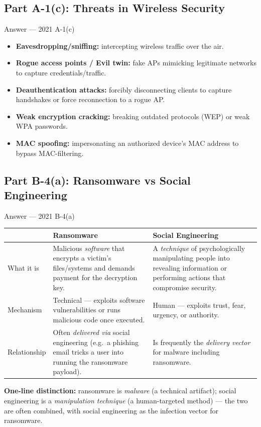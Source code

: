 \documentclass[12pt,a4paper]{article}
\begin{document}
\subsection{Part A-1(c): Threats in Wireless Security}
\begin{solbox}{Answer --- 2021 A-1(c)}
\begin{itemize}[noitemsep]
  \item \textbf{Eavesdropping/sniffing:} intercepting wireless traffic over the air.
  \item \textbf{Rogue access points / Evil twin:} fake APs mimicking legitimate networks to capture credentials/traffic.
  \item \textbf{Deauthentication attacks:} forcibly disconnecting clients to capture handshakes or force reconnection to a rogue AP.
  \item \textbf{Weak encryption cracking:} breaking outdated protocols (WEP) or weak WPA passwords.
  \item \textbf{MAC spoofing:} impersonating an authorized device's MAC address to bypass MAC-filtering.
\end{itemize}
\end{solbox}

\subsection{Part B-4(a): Ransomware vs Social Engineering}
\begin{solbox}{Answer --- 2021 B-4(a)}
\begin{center}
\renewcommand{\arraystretch}{1.3}
\begin{tabular}{l|p{5.3cm}|p{5.3cm}}
\toprule
 & \textbf{Ransomware} & \textbf{Social Engineering} \\
\midrule
What it is & Malicious \emph{software} that encrypts a victim's files/systems and demands payment for the decryption key. & A \emph{technique} of psychologically manipulating people into revealing information or performing actions that compromise security. \\
Mechanism & Technical --- exploits software vulnerabilities or runs malicious code once executed. & Human --- exploits trust, fear, urgency, or authority. \\
Relationship & Often \emph{delivered via} social engineering (e.g.\ a phishing email tricks a user into running the ransomware payload). & Is frequently the \emph{delivery vector} for malware including ransomware. \\
\bottomrule
\end{tabular}
\end{center}
\textbf{One-line distinction:} ransomware is \emph{malware} (a technical artifact); social engineering is a \emph{manipulation technique} (a human-targeted method) --- the two are often combined, with social engineering as the infection vector for ransomware.
\end{solbox}
\end{document}
